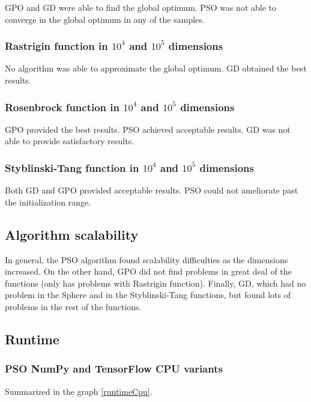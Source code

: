 \documentclass[10pt]{article}
\begin{document}
GPO and GD were able to find the global optimum. PSO was not able to converge in
the global optimum in any of the samples.

\subsubsection{Rastrigin function in $10^4$ and $10^5$ dimensions}

No algorithm was able to approximate the global optimum. GD obtained the best
results.

\subsubsection{Rosenbrock function in $10^4$ and $10^5$ dimensions}

GPO provided the best results. PSO achieved acceptable results. GD was not able
to provide satisfactory results.

\subsubsection{Styblinski-Tang function in $10^4$ and $10^5$ dimensions}

Both GD and GPO provided acceptable results. PSO could not ameliorate past the
initialization range.

\subsection{Algorithm scalability}

In general, the PSO algorithm found scalability difficulties as the dimensions
increased. On the other hand, GPO did not find problems in great deal of the
functions (only has problems with Rastrigin function). Finally, GD, which had no
problem in the Sphere and in the Styblinski-Tang functions, but found lots of
problems in the rest of the functions.

\subsection{Runtime}

\subsubsection{PSO NumPy and TensorFlow CPU variants}

Summarized in the graph \hyperref[runtimeCpu]{\ref{runtimeCpu}}.
\end{document}
